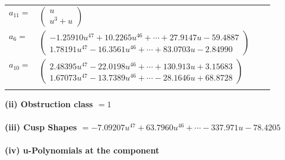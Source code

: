 \documentclass[1p]{elsarticle_modified}
\theoremstyle{definition}
\begin{document}
\begin{tabular}{m{7pt} m{180pt} m{7pt} m{180pt} }
\flushright $a_{11}=$&$\begin{pmatrix}u\\u^3+u\end{pmatrix}$ \\
\flushright $a_{6}=$&$\begin{pmatrix}-1.25910 u^{47}+10.2265 u^{46}+\cdots+27.9147 u-59.4887\\1.78191 u^{47}-16.3561 u^{46}+\cdots+83.0703 u-2.84990\end{pmatrix}$ \\
\flushright $a_{10}=$&$\begin{pmatrix}2.48395 u^{47}-22.0198 u^{46}+\cdots+130.913 u+3.15683\\1.67073 u^{47}-13.7389 u^{46}+\cdots-28.1646 u+68.8728\end{pmatrix}$\\&\end{tabular}
\flushleft \textbf{(ii) Obstruction class $= 1$}\\~\\
\flushleft \textbf{(iii) Cusp Shapes $= -7.09207 u^{47}+63.7960 u^{46}+\cdots-337.971 u-78.4205$}\\~\\
\newpage\renewcommand{\arraystretch}{1}
\flushleft \textbf{(iv) u-Polynomials at the component}\newline \\
\end{document}
